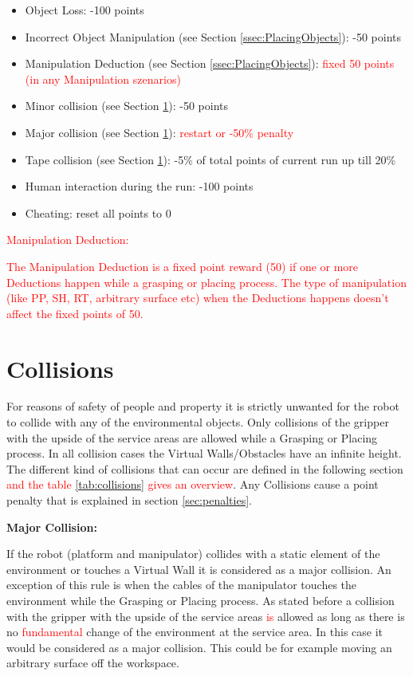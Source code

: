 \begin{itemize}
	\item Object Loss: \hfill -100 points
	\item Incorrect Object Manipulation (see Section \ref{ssec:PlacingObjects}): \hfill -50 points
	\item Manipulation Deduction (see Section \ref{ssec:PlacingObjects}): \hfill \textcolor{red}{fixed 50 points (in any Manipulation szenarios)}
	\item Minor collision (see Section \ref{sec:Collisions}): \hfill -50 points
	\item Major collision (see Section \ref{sec:Collisions}): \hfill \textcolor{red}{restart or -50\% penalty}
  \item Tape collision (see Section \ref{sec:Collisions}): \hfill -5\% of total points of current run up till
  20\%
  \item Human interaction during the run: \hfill  -100 points
  \item Cheating: \hfill reset all points to 0
\end{itemize}

\textcolor{red}{Manipulation Deduction:}

\textcolor{red}{The Manipulation Deduction is a fixed point reward (50) if one or more Deductions happen while a grasping or placing process. The type of manipulation (like PP, SH, RT, arbitrary surface etc) when the Deductions happens doesn't affect the fixed points of 50.}

\section{Collisions}\label{sec:Collisions}

For reasons of safety of people and property it is strictly unwanted for the robot to collide
with any of the environmental objects. Only collisions of the gripper with the upside of
the service areas are allowed while a Grasping or Placing process. In all collision cases the Virtual Walls/Obstacles have an infinite height. The different kind of collisions that can occur are defined in the
following section \textcolor{red}{and the table \ref{tab:collisions} gives an overview}. Any Collisions cause a point penalty that is explained in section \ref{sec:penalties}.  

\textbf{Major Collision:}

If the robot (platform and manipulator) collides with a static element of the environment or touches a Virtual Wall it is considered as a major collision. An exception of this rule is when the cables of the manipulator touches the environment while the Grasping or Placing process. As stated before a collision with the  gripper with the upside of the service areas \textcolor{red}{is} allowed as long as there is no \textcolor{red}{fundamental} change of the environment at the service area. In this case it would be considered as a major collision. This could be for example moving an arbitrary surface off the workspace. 

